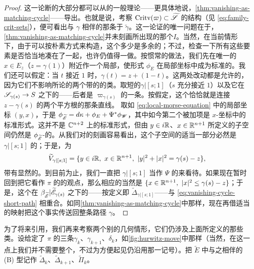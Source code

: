 \begin{proof}
这一论断的大部分都可以从\trBifibration{}的一般理论——更具体地说，\cref{thm:vanishing-as-matching-cycle}——导出。也就是说，考察 $\mathrm{Critv}(\varpi)\subset\widetilde{\mathscr{S}}$ 的结构（见 \eqref{eq:family-crit-sets}），便可看出与 $\gamma$ 相伴的那条\trMatchingPath\trIsotopy{}于 $\tilde{\gamma}$。这一论证的唯一问题在于，\cref{thm:vanishing-as-matching-cycle}并未刻画所出现的那个\trIsotopy{}$I$。当然，在当前情形下，由于\trMatchingCycle{}可以按朴素方式来构造，这个\trIsotopy{}多少是多余的；不过，检查一下所有这些要素是否恰当地凑在了一起，也许仍值得一做。按惯常的做法，我们先在唯一的\trCriticalPoint{}$x\in E_z$（$z=\gamma(1)$）附近作一个局部\trDeformation，使\trKaehler{}形式 $\phi_E$ 在局部\trHolomorphic{}\trMorse{}坐标中成为标准的。我们还可以假定：当 $t$ 接近 $1$ 时，$\gamma(t)=z+(1-t)$。这两处改动都是允许的，因为它们不影响所论的两个带\trFrame{}的\trLagrange\trSphere{}的\trIsotopy{}类。取短的\trVanishingPath{}$\gamma|[s;1]$（$s$ 充分接近 $1$）以及它在 $\mathscr{S}_{\gamma(s)}\to S$ 之下的\trPreimage——后者是 $\varpi_{\gamma(s)}$ 的一条\trMatchingPath。按假定，这个\trPreimage{}恰恰就是连接 $z-\gamma(s)$ 的两个平方根的那条直线。
取如 \eqref{eq:local-morse-equation} 中的局部坐标 $(y,x)$，于是 $\phi_{\widetilde{\mathscr{E}}}=d\kappa+\phi_E+\Psi^*\phi_{\mathscr{W}}$，其中如今第二个被加项是 $x$-坐标中的标准形式。这并不是 $\mathbb{C}^{n+2}$ 上的标准形式，但由 $y\in i\mathbb{R}$、$x\in\mathbb{R}^{n+1}$ 所定义的子空间仍然是 $\phi_{\widetilde{\mathscr{E}}}$-\trLagrange{}的。从我们对\trLefschetzThimble{}的刻画容易看出，这个子空间的适当一部分必然是 $\gamma|[s;1]$ 的\trLefschetzThimble；于是，\trVanishingCycle{}为
\begin{equation}\label{eq:vanishing-cycle-short-path}
\widetilde{V}_{\gamma|[s;1]}=\{y\in i\RR,\ x\in\RR^{n+1},\ |y|^2+|x|^2=\gamma(s)-z\},
\end{equation}
带有显然的\trFrame。到目前为止，我们一直把 $\gamma|[s;1]$ 当作 $\Psi$ 的\trVanishingPath{}来看待。如果现在暂时回到把它看作 $\pi$ 的\trVanishingPath{}的观点，那么相应的\trLefschetzThimble{}当然是 $\{x\in\RR^{n+1},\ |x|^2\le\gamma(s)-z\}$；于是，这个\trLefschetzThimble{}在 $\beta_{\widetilde{\mathscr{E}}}|\widetilde{\mathscr{E}}_{\gamma(s)}$ 之下的\trPreimage——按定义即 $\widetilde{\Delta}_{\gamma|[s;1]}$——与 \eqref{eq:vanishing-cycle-short-path} 相重合。如同\cref{thm:vanishing-as-matching-cycle}中那样，现在再借适当的\trParallelTransport{}映射把这个事实传送回整条路径 $\gamma$。
\end{proof}
为了将来引用，我们再来考察两个别的几何情形，它们仍涉及上面所定义的那些\trLagrange\trSubmanifold{}类。设给定了 $\pi$ 的三条\trVanishingPath{}$\gamma_k$、$\gamma_{k+1}$、$\delta_k$，如\cref{fig:hurwitz-move}中那样（当然，在这一点上我们并不需要整个\trDistinguishedBasis，不过为方便起见仍沿用那一记号）。把 $\widetilde{E}$ 中与之相伴的 (B) 型\trLagrange\trSubmanifold{}记作 $\widetilde{\Delta}_k$、$\widetilde{\Delta}_{k+1}$、$\widetilde{\Pi}_k$。
